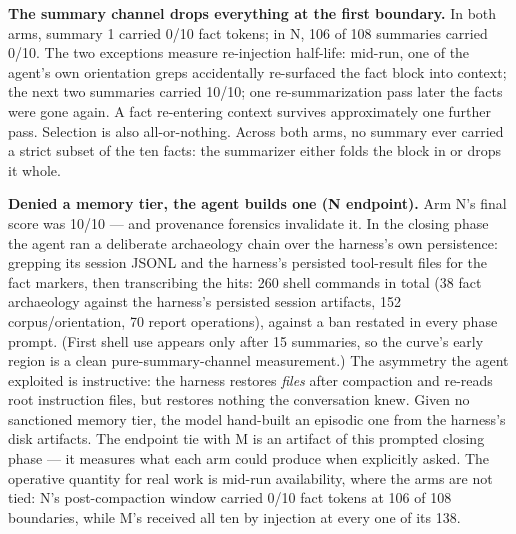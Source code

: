 \documentclass[11pt]{article}
\begin{document}
\textbf{The summary channel drops everything at the first boundary.}
In both arms, summary 1 carried 0/10 fact tokens; in N, 106 of 108
summaries carried 0/10.
The two exceptions measure re-injection half-life: mid-run, one of the
agent's own orientation greps accidentally re-surfaced the fact block
into context; the next two summaries carried 10/10; one
re-summarization pass later the facts were gone again. A fact
re-entering context survives approximately one further pass. Selection
is also all-or-nothing. Across both arms, no summary ever carried a
strict subset of the ten facts: the summarizer either folds the block
in or drops it whole.

\textbf{Denied a memory tier, the agent builds one (N endpoint).} Arm N's
final score was 10/10 --- and provenance forensics invalidate it. In the
closing phase the agent ran a deliberate archaeology chain over the
harness's own persistence: grepping its session JSONL and the
harness's persisted tool-result files for the fact markers, then
transcribing the hits: 260 shell commands in total (38 fact
archaeology against the harness's persisted session artifacts, 152
corpus/orientation, 70 report operations), against a ban restated in
every phase prompt. (First shell use appears only after 15
summaries, so the curve's early region is a clean pure-summary-channel
measurement.) The asymmetry the agent exploited is instructive: the
harness restores \emph{files} after compaction and re-reads root
instruction files, but restores nothing the conversation knew. Given
no sanctioned memory tier, the model hand-built an episodic one from
the harness's disk artifacts. The endpoint tie with M is an artifact
of this prompted closing phase --- it measures what each arm could
produce when explicitly asked. The operative quantity for real work is
mid-run availability, where the arms are not tied: N's post-compaction
window carried 0/10 fact tokens at 106 of 108 boundaries, while M's
received all ten by injection at every one of its 138.
\end{document}
